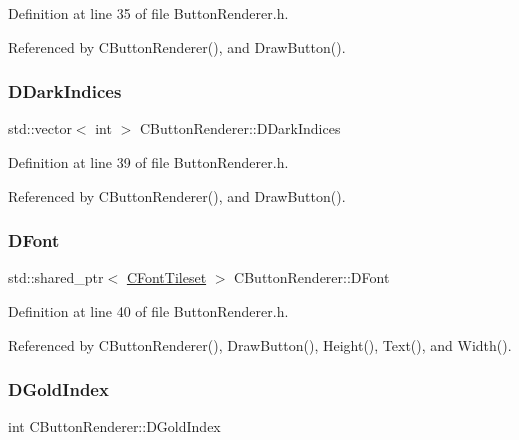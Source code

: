 Definition at line 35 of file Button\+Renderer.\+h.



Referenced by C\+Button\+Renderer(), and Draw\+Button().

\hypertarget{classCButtonRenderer_a0f0723933f4800dcded7a4d180a87831}{}\label{classCButtonRenderer_a0f0723933f4800dcded7a4d180a87831} 
\subsubsection{\texorpdfstring{D\+Dark\+Indices}{DDarkIndices}}
{\footnotesize\ttfamily std\+::vector$<$ int $>$ C\+Button\+Renderer\+::\+D\+Dark\+Indices\hspace{0.3cm}{\ttfamily [protected]}}



Definition at line 39 of file Button\+Renderer.\+h.



Referenced by C\+Button\+Renderer(), and Draw\+Button().

\hypertarget{classCButtonRenderer_adcdace35cb4fac1c90368b7cc86d860a}{}\label{classCButtonRenderer_adcdace35cb4fac1c90368b7cc86d860a} 
\subsubsection{\texorpdfstring{D\+Font}{DFont}}
{\footnotesize\ttfamily std\+::shared\+\_\+ptr$<$ \hyperlink{classCFontTileset}{C\+Font\+Tileset} $>$ C\+Button\+Renderer\+::\+D\+Font\hspace{0.3cm}{\ttfamily [protected]}}



Definition at line 40 of file Button\+Renderer.\+h.



Referenced by C\+Button\+Renderer(), Draw\+Button(), Height(), Text(), and Width().

\hypertarget{classCButtonRenderer_aba9e3360876958aad5eb83c66b2c4ae5}{}\label{classCButtonRenderer_aba9e3360876958aad5eb83c66b2c4ae5} 
\subsubsection{\texorpdfstring{D\+Gold\+Index}{DGoldIndex}}
{\footnotesize\ttfamily int C\+Button\+Renderer\+::\+D\+Gold\+Index\hspace{0.3cm}{\ttfamily [protected]}}



